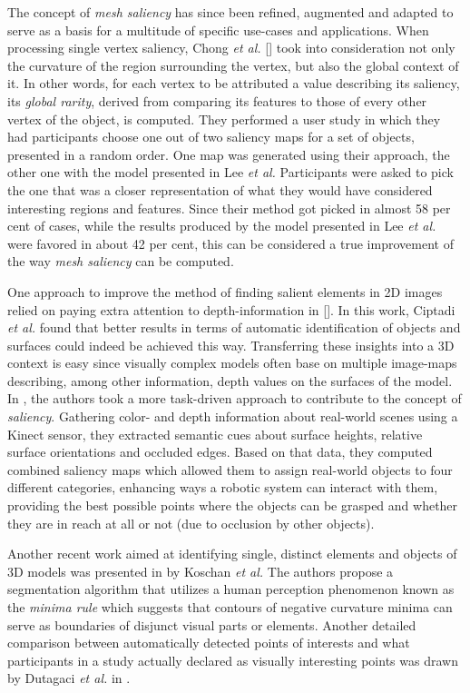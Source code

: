 The concept of \textit{mesh saliency} has since been refined, augmented and adapted to serve as a basis for a multitude of specific use-cases and applications. When processing single vertex saliency, Chong \textit{et al.} [\cite{wu2013mesh}] took into consideration not only the curvature of the region surrounding the vertex, but also the global context of it. In other words, for each vertex to be attributed a value describing its saliency, its \textit{global rarity}, derived from comparing its features to those of every other vertex of the object, is computed. They performed a user study in which they had participants choose one out of two saliency maps for a set of objects, presented in a random order. One map was generated using their approach, the other one with the model presented in Lee \textit{et al.} Participants were asked to pick the one that was a closer representation of what they would have considered interesting regions and features. Since their method got picked in almost 58 per cent of cases, while the results produced by the model presented in Lee \textit{et al.} were favored in about 42 per cent, this can be considered a true improvement of the way \textit{mesh saliency} can be computed.

One approach to improve the method of finding salient elements in 2D images relied on paying extra attention to depth-information in [\cite{ciptadi2013depth}]. In this work, Ciptadi \textit{et al.} found that better results in terms of automatic identification of objects and surfaces could indeed be achieved this way. Transferring these insights into a 3D context is easy since visually complex models often base on multiple image-maps describing, among other information, depth values on the surfaces of the model.
In \cite{potapova2011learning}, the authors took a more task-driven approach to contribute to the concept of \textit{saliency}. Gathering color- and depth information about real-world scenes using a Kinect sensor, they extracted semantic cues about surface heights, relative surface orientations and occluded edges. Based on that data, they computed combined saliency maps which allowed them to assign real-world objects to four different categories, enhancing ways a robotic system can interact with them, providing the best possible points where the objects can be grasped and whether they are in reach at all or not (due to occlusion by other objects).

Another recent work aimed at identifying single, distinct elements and objects of 3D models was presented in \cite{koschan2003perception} by Koschan \textit{et al.} The authors propose a segmentation algorithm that utilizes a human perception phenomenon known as the \textit{minima rule} which suggests that contours of negative curvature minima can serve as boundaries of disjunct visual parts or elements. Another detailed comparison between automatically detected points of interests and what participants in a study actually declared as visually interesting points was drawn by Dutagaci \textit{et al.} in \cite{dutagaci2012evaluation}.

